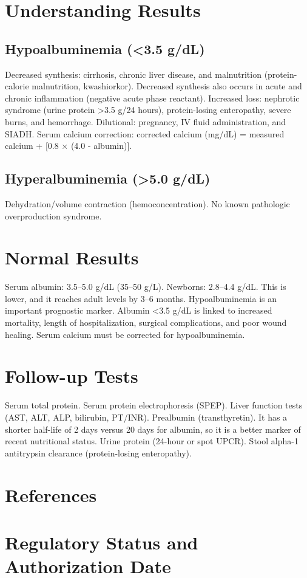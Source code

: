 \section*{Understanding Results}
\subsection*{Hypoalbuminemia (<3.5 g/dL)}
Decreased synthesis: cirrhosis, chronic liver disease, and malnutrition (protein-calorie malnutrition, kwashiorkor). Decreased synthesis also occurs in acute and chronic inflammation (negative acute phase reactant). Increased loss: nephrotic syndrome (urine protein >3.5 g/24 hours), protein-losing enteropathy, severe burns, and hemorrhage. Dilutional: pregnancy, IV fluid administration, and SIADH. Serum calcium correction: corrected calcium (mg/dL) = measured calcium + [0.8 $\times$ (4.0 - albumin)].
\subsection*{Hyperalbuminemia (>5.0 g/dL)}
Dehydration/volume contraction (hemoconcentration). No known pathologic overproduction syndrome.
\section*{Normal Results}
Serum albumin: 3.5--5.0 g/dL (35--50 g/L). Newborns: 2.8--4.4 g/dL. This is lower, and it reaches adult levels by 3--6 months. Hypoalbuminemia is an important prognostic marker. Albumin <3.5 g/dL is linked to increased mortality, length of hospitalization, surgical complications, and poor wound healing. Serum calcium must be corrected for hypoalbuminemia.
\section*{Follow-up Tests}
Serum total protein. Serum protein electrophoresis (SPEP). Liver function tests (AST, ALT, ALP, bilirubin, PT/INR). Prealbumin (transthyretin). It has a shorter half-life of 2 days versus 20 days for albumin, so it is a better marker of recent nutritional status. Urine protein (24-hour or spot UPCR). Stool alpha-1 antitrypsin clearance (protein-losing enteropathy).
\section*{References}



\clearpage
\section*{Regulatory Status and Authorization Date}

\clearpage
